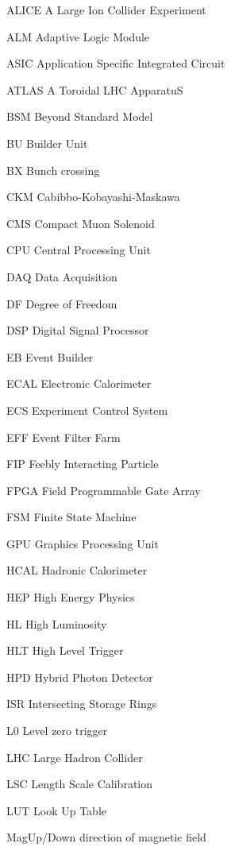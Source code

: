 \begin{abbreviations}
    \item[ALICE] A Large Ion Collider Experiment
    \item[ALM] Adaptive Logic Module
    \item[ASIC] Application Specific Integrated Circuit
    \item[ATLAS] A Toroidal LHC ApparatuS
    \item[BSM] Beyond Standard Model
    \item[BU] Builder Unit
    \item[BX] Bunch crossing
    \item[CKM] Cabibbo-Kobayashi-Maskawa
    \item[CMS] Compact Muon Solenoid
    \item[CPU] Central Processing Unit
    \item[DAQ] Data Acquisition
    \item[DF] Degree of Freedom
    \item[DSP] Digital Signal Processor
    \item[EB] Event Builder
    \item[ECAL] Electronic Calorimeter
    \item[ECS] Experiment Control System
    \item[EFF] Event Filter Farm
    \item[FIP] Feebly Interacting Particle
    \item[FPGA] Field Programmable Gate Array
    \item[FSM] Finite State Machine
    \item[GPU] Graphics Processing Unit
    \item[HCAL] Hadronic Calorimeter
    \item[HEP] High Energy Physics
    \item[HL] High Luminosity
    \item[HLT] High Level Trigger
    \item[HPD] Hybrid Photon Detector
    \item[ISR] Intersecting Storage Rings
    \item[L$0$] Level zero trigger
    \item[LHC] Large Hadron Collider
    \item[LSC] Length Scale Calibration
    \item[LUT] Look Up Table
    \item[MagUp/Down] direction of magnetic field

\end{abbreviations}
